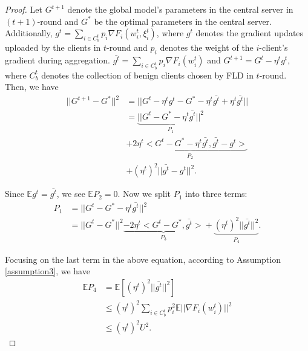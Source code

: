 \begin{proof}
Let $G^{t+1}$ denote the global model's parameters in the central server in $(t+1)$-round and $G^*$ be the optimal parameters in the central server. Additionally, $g^t=\sum\limits_{i\in C_b^t}p_i\nabla F_i(w_i^t,\xi_i^t)$, where $g^t$ denotes the gradient updates uploaded by the clients in $t$-round and $p_i$ denotes the weight of the $i$-client's gradient during aggregation. $\bar{g^t}=\sum\limits_{i\in C_b^t}p_i\nabla F_i(w_i^t)$ and $G^{t+1}=G^t-\eta^t g^t$, where $C_b^t$ denotes the collection of benign clients chosen by FLD in $t$-round. Then, we have 
\begin{equation}
    \begin{split}\label{ineq1}
	||G^{t+1}-G^*||^2
	& = ||G^t-\eta^t g^t-G^*-\eta^t \bar{g^t} + \eta^t \bar{g^t}|| \\
	& = \underbrace{||G^t-G^*-\eta^t \bar{g^t}||^2}_{P_1} \\
        & +\underbrace{2\eta^t<G^t-G^*-\eta^t \bar{g^t},\bar{g^t}-g^t>}_{P_2} \\
	& +(\eta^t)^2||\bar{g^t}-g^t||^2.
    \end{split}
\end{equation}

Since $\mathbb{E}g^t=\bar{g^t}$, we see $\mathbb{E}P_2=0$. Now we split $P_1$ into three terms:   
\begin{equation}
    \begin{split}\label{ineq2}
	P_1
	& = ||G^t-G^*-\eta^t \bar{g^t}||^2 \\
	& = ||G^t-G^*||^2\underbrace{-2\eta^t<G^t-G^*,\bar{g^t}>}_{P_3}+\underbrace{(\eta^t)^2||\bar{g^t}||^2}_{P_4}.
    \end{split}
\end{equation}

Focusing on the last term in the above equation, according to Assumption \ref{assumption3}, we have 
\begin{equation*}
\begin{split}
    \mathbb{E}P_4
 & =\mathbb{E}[(\eta^t)^2||\bar{g^t}||^2] \\
 & \leq (\eta^t)^2\sum\limits_{i\in C_b^t}p_i^2\mathbb{E}||\nabla F_i(w_i^t)||^2 \\
 & \leq (\eta^t)^2 U^2 .  
\end{split}
\end{equation*}


\end{proof}
